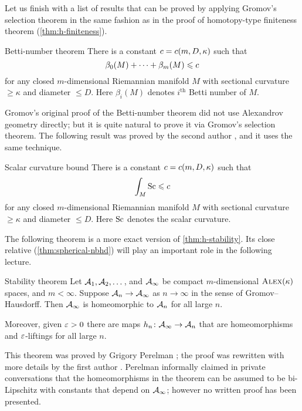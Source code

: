 Let us finish with a list of results that can be proved by applying Gromov's selection theorem
in the same fashion as in the proof of homotopy-type finiteness theorem (\ref{thm:h-finiteness}).

\begin{thm}{Betti-number theorem}
There is a constant $c=c(m,D,\kappa)$ such that 
\[\beta_0(M)+\dots+\beta_m(M)\leqslant c\]
for any closed $m$-dimensional Riemannian manifold $M$ with sectional curvature $\ge \kappa$ and diameter $\le D$.
Here $\beta_i(M)$ denotes $i^\text{th}$ Betti number of $M$.
\end{thm}

Gromov's original proof \cite{gromov-1981} of the Betti-number theorem did not use Alexandrov geometry directly;
but it is quite natural to prove it via Gromov's selection theorem.
The following result was proved by the second author \cite{petrunin2008}, and it uses the same technique.

\begin{thm}{Scalar curvature bound}
There is a constant $c=c(m,D,\kappa)$ such that 
\[\int_M\mathrm{Sc}\leqslant c\]
for any closed $m$-dimensional Riemannian manifold $M$ with sectional curvature $\ge \kappa$ and diameter $\le D$.
Here $\mathrm{Sc}$ denotes the scalar curvature.
\end{thm}

The following theorem is a more exact version of \ref{thm:h-stability}.
Its close relative (\ref{thm:spherical-nbhd}) will play an important role in the following lecture.

\begin{thm}{Stability theorem}\label{thm:stability}
Let $\mathcal{A}_1,\mathcal{A}_2,\dots$, and $\mathcal{A}_\infty$ be compact $m$-dimensional $\textsc{Alex}(\kappa)$ spaces, and $m<\infty$.
Suppose $\mathcal{A}_n\to \mathcal{A}_\infty$ as $n\to \infty$ in the sense of Gromov--Hausdorff.
Then $\mathcal{A}_\infty$ is homeomorphic to $\mathcal{A}_n$ for all large $n$.

Moreover, given $\varepsilon>0$ there are maps $h_n\colon\mathcal{A}_\infty\to \mathcal{A}_n$ that are homeomorphisms and $\varepsilon$-liftings for all large $n$.
\end{thm}

This theorem was proved by Grigory Perelman \cite{perelman1991};
the proof was rewritten with more details by the first author \cite{kapovitch}.
Perelman  informally claimed in private conversations that the homeomorphisms in the theorem can be assumed to be bi-Lipschitz with constants that depend on $\mathcal{A}_\infty$;
however no written proof has been presented.


